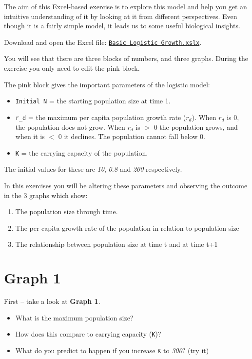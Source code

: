 \documentclass[
  a4paper]{book}
\providecommand{\tightlist}{%
  \setlength{\itemsep}{0pt}\setlength{\parskip}{0pt}}
\begin{document}
The aim of this Excel-based exercise is to explore this model and help
you get an intuitive understanding of it by looking at it from different
perspectives. Even though it is a fairly simple model, it leads us to
some useful biological insights.

Download and open the Excel file:
\href{https://www.dropbox.com/s/oxxyyn4zf4wsvkg/Basic\%20Logistic\%20Growth.xlsx?dl=1}{\texttt{Basic\ Logistic\ Growth.xslx}}.

You will see that there are three blocks of numbers, and three graphs.
During the exercise you only need to edit the pink block.

The pink block gives the important parameters of the logistic model:

\begin{itemize}
\tightlist
\item
  \texttt{Initial\ N} = the starting population size at time 1.
\item
  \texttt{r\_d} = the maximum per capita population growth rate
  (\(r_d\)). When \(r_d\) is 0, the population does not grow. When
  \(r_d\) is \(>\) 0 the population grows, and when it is \(<\) 0 it
  declines. The population cannot fall below 0.
\item
  \texttt{K} = the carrying capacity of the population.
\end{itemize}

The initial values for these are \emph{10}, \emph{0.8} and \emph{200}
respectively.

In this exercises you will be altering these parameters and observing
the outcome in the 3 graphs which show:

\begin{enumerate}
\def\labelenumi{\arabic{enumi}.}
\tightlist
\item
  The population size through time.
\item
  The per capita growth rate of the population in relation to population
  size
\item
  The relationship between population size at time t and at time t+1
\end{enumerate}

\hypertarget{graph-1}{%
\section{Graph 1}\label{graph-1}}

First -- take a look at \textbf{Graph 1}.

\begin{itemize}
\tightlist
\item
  What is the maximum population size?
\item
  How does this compare to carrying capacity (\texttt{K})?
\item
  What do you predict to happen if you increase \texttt{K} to
  \emph{300}? (try it)
\end{itemize}
\end{document}
